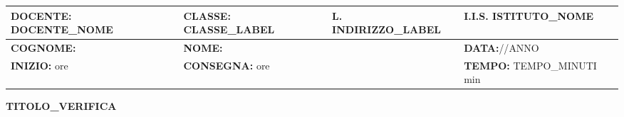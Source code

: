 \noindent
\begin{tabularx}{\textwidth}{|p{5.8cm}|p{2.6cm}|p{3.2cm}|p{3.85cm}|}
\hline
\textbf{DOCENTE:} {{DOCENTE_NOME}} &
\textbf{CLASSE:} {{CLASSE_LABEL}} &
\textbf{L.} {{INDIRIZZO_LABEL}} &
\textbf{I.I.S.} {{ISTITUTO_NOME}}\\
\hline
\textbf{COGNOME:} &
\multicolumn{2}{l|}{\textbf{NOME:}} &
\textbf{DATA:}\raisebox{-1mm}{\rule{0.65cm}{0.4pt}}/\raisebox{-1mm}{\rule{0.65cm}{0.4pt}}/{{ANNO}}\\
\hline
\textbf{INIZIO:} ore\hspace{3cm}&
\multicolumn{2}{l|}{\textbf{CONSEGNA:} ore }&
\textbf{TEMPO:} {{TEMPO_MINUTI}} min\\
\hline
\end{tabularx}
\vspace{0.3cm}

\begin{center}
    {\large \bfseries {{TITOLO_VERIFICA}} \par}
\end{center}
